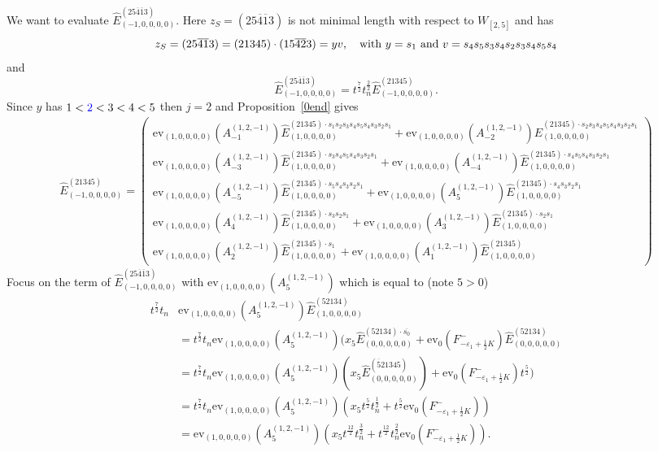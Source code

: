 \documentclass[11pt]{article}
\theoremstyle{plain}
\theoremstyle{definition}
\newenvironment{example}
  {\pushQED{\qed}\exampleinner}
  {\popQED\endexampleinner}
\theoremstyle{remark}
\numberwithin{equation}{section}
\def\ev{\mathrm{ev}}
\newcounter{r}
\newcounter{s}
\begin{document}
\begin{example}
We want to evaluate  
$\widehat{E}^{(25\overline{4}\overline{1}3)}_{(-1,0,0,0,0)}$.
Here $z_S=(25\overline{4}\overline{1}3)$ is not minimal length with respect to
$W_{[2,5]}$ and has
$$z_S = (25\overline{4}\overline{1}3)
= (21345)\cdot(15\overline{4}\overline{2}3) = yv,
\quad\hbox{with $y=s_1$ and $v = s_4s_5s_3s_4s_2s_3s_4s_5s_4$}
$$
and
$$\widehat{E}^{(25\overline{4}\overline{1}3)}_{(-1,0,0,0,0)} = t^{\frac72}t_n^{\frac22} \widehat{E}^{(21345)}_{(-1,0,0,0,0)}.$$
Since $y$ has $1< {\color{blue}2} <3<4<5$ then $j=2$ and Proposition~\ref{0end} gives
\begin{align*}
\widehat{E}^{(21345)}_{(-1,0,0,0,0)}
=
\left(\begin{array}{l}
\ev_{(1,0,0,0,0)}(A^{(1,2,-1)}_{-1}) \widehat{E}^{(21345)\cdot s_1s_2s_3s_4s_5s_4s_3s_2s_1}_{(1,0,0,0,0)}
+\ev_{(1,0,0,0,0)}(A^{(1,2,-1)}_{-2}) \widehat{E}^{(21345)\cdot s_2s_3s_4s_5s_4s_3s_2s_1}_{(1,0,0,0,0)}
\\
\ev_{(1,0,0,0,0)}(A^{(1,2,-1)}_{-3}) \widehat{E}^{(21345)\cdot s_3s_4s_5s_4s_3s_2s_1}_{(1,0,0,0,0)}
+\ev_{(1,0,0,0,0)}(A^{(1,2,-1)}_{-4}) \widehat{E}^{(21345)\cdot s_4s_5s_4s_3s_2s_1}_{(1,0,0,0,0)}
\\
\ev_{(1,0,0,0,0)}(A^{(1,2,-1)}_{-5}) \widehat{E}^{(21345)\cdot s_5s_4s_3s_2s_1}_{(1,0,0,0,0)}
+\ev_{(1,0,0,0,0)}(A^{(1,2,-1)}_{5}) \widehat{E}^{(21345)\cdot s_4s_3s_2s_1}_{(1,0,0,0,0)}
\\
\ev_{(1,0,0,0,0)}(A^{(1,2,-1)}_{4}) \widehat{E}^{(21345)\cdot s_3s_2s_1}_{(1,0,0,0,0)}
+\ev_{(1,0,0,0,0)}(A^{(1,2,-1)}_{3}) \widehat{E}^{(21345)\cdot s_2s_1}_{(1,0,0,0,0)}
\\
\ev_{(1,0,0,0,0)}(A^{(1,2,-1)}_{2}) \widehat{E}^{(21345)\cdot s_1}_{(1,0,0,0,0)}
+\ev_{(1,0,0,0,0)}(A^{(1,2,-1)}_{1}) \widehat{E}^{(21345)}_{(1,0,0,0,0)}
\end{array}
\right)
\end{align*}
Focus on the term of $\widehat{E}^{(25\overline{4}\overline{1}3)}_{(-1,0,0,0,0)}$ with $\ev_{(1,0,0,0,0)}(A^{(1,2,-1)}_{5}) $ which is equal to 
(note $5>0$)
\begin{align*}
t^{\frac72}t_n &\ev_{(1,0,0,0,0)}(A^{(1,2,-1)}_{5}) \widehat{E}^{(52134)}_{(1,0,0,0,0)}
\\
&=t^{\frac72}t_n \ev_{(1,0,0,0,0)}(A^{(1,2,-1)}_{5})
(x_5  \widehat{E}^{(52134)\cdot \overline{s_0}}_{(0,0,0,0,0)}
+\ev_0(F^-_{-\varepsilon_1+\frac12 K})\widehat{E}^{(52134)}_{(0,0,0,0,0)}
\\
&= t^{\frac72}t_n \ev_{(1,0,0,0,0)}(A^{(1,2,-1)}_{5})
(x_5  \widehat{E}^{(\overline{5}21345)}_{(0,0,0,0,0)})
+\ev_0(F^-_{-\varepsilon_1+\frac12 K})t^{\frac52})
\\
&=t^{\frac72}t_n \ev_{(1,0,0,0,0)}(A^{(1,2,-1)}_{5})
(x_5  t^{\frac52}t_n^{\frac12}
+t^{\frac52} \ev_0(F^-_{-\varepsilon_1+\frac12 K}))
\\
&= \ev_{(1,0,0,0,0)}(A^{(1,2,-1)}_{5})
(x_5  t^{\frac{12}{2}}t_n^{\frac32}
+t^{\frac{12}{2}} t_n^{\frac22} \ev_0(F^-_{-\varepsilon_1+\frac12 K})).
\end{align*}




\end{example}
\end{document}
